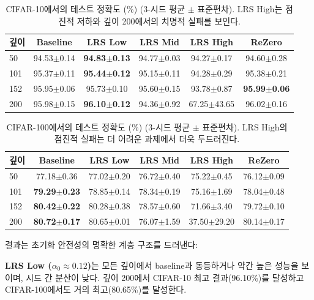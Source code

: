 \documentclass[preprint,12pt]{elsarticle}
\begin{document}
\begin{table}[t]
\centering
\caption{CIFAR-10에서의 테스트 정확도 (\%) (3-시드 평균 $\pm$ 표준편차). LRS High는 점진적 저하와 깊이 200에서의 치명적 실패를 보인다.}
\label{tab:cifar10}
\begin{tabular}{lccccc}
\toprule
\textbf{깊이} & \textbf{Baseline} & \textbf{LRS Low} & \textbf{LRS Mid} & \textbf{LRS High} & \textbf{ReZero} \\
\midrule
50  & 94.53$\pm$0.14 & \textbf{94.83$\pm$0.13} & 94.77$\pm$0.03 & 94.27$\pm$0.17 & 94.60$\pm$0.28 \\
101 & 95.37$\pm$0.11 & \textbf{95.44$\pm$0.12} & 95.15$\pm$0.11 & 94.28$\pm$0.29 & 95.38$\pm$0.21 \\
152 & 95.95$\pm$0.06 & 95.73$\pm$0.10 & 95.60$\pm$0.15 & 93.78$\pm$0.87 & \textbf{95.99$\pm$0.06} \\
200 & 95.98$\pm$0.15 & \textbf{96.10$\pm$0.12} & 94.36$\pm$0.92 & 67.25$\pm$43.65 & 96.02$\pm$0.16 \\
\bottomrule
\end{tabular}
\end{table}

\begin{table}[t]
\centering
\caption{CIFAR-100에서의 테스트 정확도 (\%) (3-시드 평균 $\pm$ 표준편차). LRS High의 점진적 실패는 더 어려운 과제에서 더욱 두드러진다.}
\label{tab:cifar100}
\begin{tabular}{lccccc}
\toprule
\textbf{깊이} & \textbf{Baseline} & \textbf{LRS Low} & \textbf{LRS Mid} & \textbf{LRS High} & \textbf{ReZero} \\
\midrule
50  & 77.18$\pm$0.36 & 77.02$\pm$0.20 & 76.72$\pm$0.40 & 75.22$\pm$0.45 & 76.12$\pm$0.09 \\
101 & \textbf{79.29$\pm$0.23} & 78.85$\pm$0.14 & 78.34$\pm$0.19 & 75.16$\pm$1.69 & 78.04$\pm$0.48 \\
152 & \textbf{80.42$\pm$0.22} & 80.28$\pm$0.38 & 78.57$\pm$0.60 & 71.66$\pm$3.40 & 79.72$\pm$0.10 \\
200 & \textbf{80.72$\pm$0.17} & 80.65$\pm$0.01 & 76.07$\pm$1.59 & 37.50$\pm$29.20 & 80.14$\pm$0.17 \\
\bottomrule
\end{tabular}
\end{table}

결과는 초기화 안전성의 명확한 계층 구조를 드러낸다:

\textbf{LRS Low ($\alpha_0 \approx 0.12$)}는 모든 깊이에서 baseline과 동등하거나 약간 높은 성능을 보이며, 시드 간 분산이 낮다. 깊이 200에서 CIFAR-10 최고 결과(96.10\%)를 달성하고 CIFAR-100에서도 거의 최고(80.65\%)를 달성한다.
\end{document}
